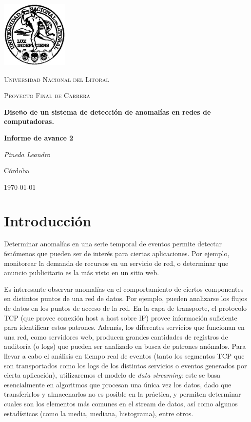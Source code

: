 \documentclass[a4paper,10pt, oneside]{article}
\begin{document}
	
\begin{titlepage}
	\centering
	\includegraphics[width=0.25\textwidth]{../../Universidad_del_Litoral}\par\vspace{1cm}
	{\scshape\LARGE Universidad Nacional del Litoral \par}
	\vspace{1cm}
	{\scshape\Large Proyecto Final de Carrera\par}
	\vspace{1.5cm}
	{\huge\bfseries Diseño de un sistema de detección de anomalías en redes de computadoras.\par}
	\vspace{4cm}
	{\huge\bfseries Informe de avance 2\par}
	\vfill
	
	{\Large \itshape Pineda Leandro\par}
	
	
	\large Córdoba\par
	{\large \today\par}	
\end{titlepage}

\modulolinenumbers[5]
\linenumbers

\section{Introducción}
Determinar anomalías en una serie temporal de eventos permite detectar fenómenos que pueden ser de interés para ciertas aplicaciones. Por ejemplo, monitorear la demanda de recursos en un servicio de red, o determinar que anuncio publicitario es la más visto en un sitio web.

Es interesante observar anomalías en el comportamiento de ciertos componentes en distintos puntos de una red de datos. Por ejemplo, pueden analizarse los flujos de datos en los puntos de acceso de la red. En la capa de transporte, el protocolo TCP (que provee conexión host a host sobre IP) provee información suficiente para identificar estos patrones. Además, los diferentes servicios que funcionan en una red, como servidores web, producen grandes cantidades de registros de auditoría (o logs) que pueden ser analizado en busca de patrones anómalos.
Para llevar a cabo el análisis en tiempo real de eventos (tanto los segmentos TCP que son transportados como los logs de los distintos servicios o eventos generados por cierta aplicación), utilizaremos el modelo de \textit{data streaming}: este se basa esencialmente en algoritmos que procesan una única vez los datos, dado que transferirlos y almacenarlos no es posible en la práctica, y permiten determinar cuales son los elementos más comunes en el stream de datos, así como algunos estadísticos (como la media, mediana, histograma), entre otros.
\end{document}
